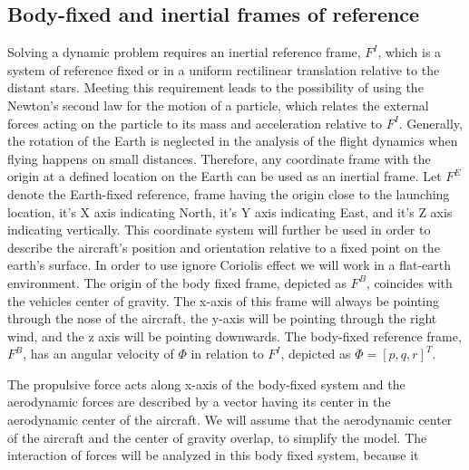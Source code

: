 \documentclass[conference]{IEEEtran}
\begin{document}
\subsection{Body-fixed and inertial frames of reference}
Solving a dynamic problem requires an inertial reference frame, $F^I$, which is
a system of reference fixed or in a uniform rectilinear translation relative to
the distant stars. Meeting this requirement leads to the possibility of using
the Newton's second law for the motion of a particle, which relates the
external forces acting on the particle to its mass and acceleration relative to
$F^I$. Generally, the rotation of the Earth is neglected in the analysis of the
flight dynamics when flying happens on small distances. Therefore, any
coordinate frame with the origin at a defined location on the Earth can be used
as an inertial frame. Let $F^E$ denote the Earth-fixed reference, frame having
the origin close to the launching location, it's X axis indicating North, it's
Y axis indicating East, and it's Z axis indicating vertically. This coordinate
system will further be used in order to describe the aircraft's position and
orientation relative to a fixed point on the earth's surface. In order to use
ignore Coriolis effect we will work in a flat-earth environment. The origin of
the body fixed frame, depicted as $F^B$, coincides with the vehicles center of
gravity. The x-axis of this frame will always be pointing through the nose of
the aircraft, the y-axis will be pointing through the right wind, and the z
axis will be pointing downwards. The body-fixed reference frame, $F^B$, has an
angular velocity of $\varPhi$ in relation to $F^I$, depicted as
$\varPhi={[p,q,r]}^T$.
\par
The propulsive force acts along x-axis of the body-fixed system and the
aerodynamic forces are described by a vector having its center in the
aerodynamic center of the aircraft. We will assume that the aerodynamic center
of the aircraft and the center of gravity overlap, to simplify the model. The
interaction of forces will be analyzed in this body fixed system, because it
\end{document}
